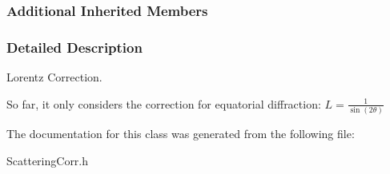 \subsubsection*{Additional Inherited Members}


\subsubsection{Detailed Description}
Lorentz Correction. 

So far, it only considers the correction for equatorial diffraction\-: $ L = \frac{1}{\sin(2\theta)} $ 

The documentation for this class was generated from the following file\-:\begin{DoxyCompactItemize}
\item 
Scattering\-Corr.\-h\end{DoxyCompactItemize}
